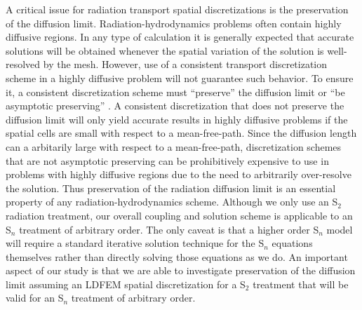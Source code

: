 \documentclass[preprint,12pt]{elsarticle}
\begin{document}
  
A critical issue for radiation transport spatial discretizations is the preservation of the diffusion limit.  
Radiation-hydrodynamics problems often contain highly diffusive regions.  In any type of calculation it is generally expected that 
accurate solutions will be obtained whenever the spatial variation of the solution is well-resolved by the mesh.  However, use of 
a consistent transport discretization scheme in a highly diffusive problem will not guarantee such behavior.  To ensure it, a consistent 
discretization scheme must ``preserve'' the diffusion limit or ``be asymptotic preserving'' \cite{larsenmorel}.  A consistent discretization 
that does not preserve the diffusion limit will only yield accurate results in highly diffusive problems if the spatial cells are small with 
respect to a mean-free-path.  Since the diffusion length can a arbitarily large with respect to a mean-free-path, discretization schemes that 
are not asymptotic preserving can be prohibitively expensive to use in problems with highly diffusive regions due to the need to arbitrarily 
over-resolve the solution. Thus preservation of the radiation diffusion limit is an essential property of any radiation-hydrodynamics scheme.  
Although we only use an S$_2$ radiation treatment, our overall coupling and solution scheme is applicable to an S$_n$ treatment of arbitrary 
order.  The only caveat is that a higher order S$_n$ model will require a standard iterative solution technique for the S$_n$ equations themselves 
rather than directly solving those equations as we do. An 
important aspect of our study is that we are able to investigate preservation of the diffusion limit assuming an LDFEM spatial discretization 
for a S$_2$ treatment that will be valid for an S$_n$ treatment of arbitrary order.  
\end{document}
